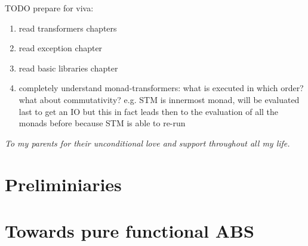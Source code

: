 \documentclass[oneside]{book}
\begin{document}
TODO prepare for viva:
\begin{enumerate}
	\item read transformers chapters
	
	\item read exception chapter

	\item read basic libraries chapter	
	
	\item completely understand monad-transformers: what is executed in which order? what about commutativity? e.g. STM is innermost monad, will be evaluated last to get an IO but this in fact leads then to the evaluation of all the monads before because STM is able to re-run
\end{enumerate}


\clearpage
\tableofcontents
\clearpage
\textit{To my parents for their unconditional love and support throughout all my life.}
\clearpage



\epigraphhead[450]{}
\part{Preliminiaries}









\epigraphhead[450]{}
\part{Towards pure functional ABS}

\end{document}
